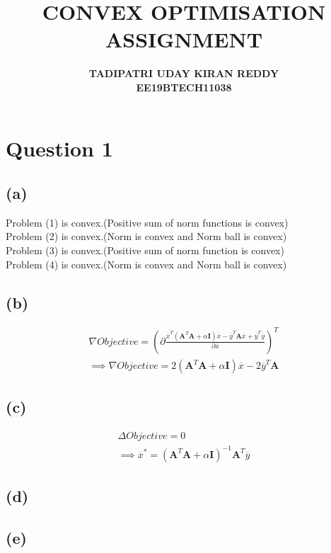\documentclass{article}
\begin{document}
\title{\textbf{CONVEX OPTIMISATION}\\{\textbf{ASSIGNMENT }}}
\author{\textbf{TADIPATRI UDAY KIRAN REDDY}\\\textbf{EE19BTECH11038}}
\maketitle

\section*{\hfil Question 1}
\subsection*{(a)}
Problem (1) is convex.(Positive sum of norm functions is convex)\\
Problem (2) is convex.(Norm is convex and Norm ball is convex)\\
Problem (3) is convex.(Positive sum of norm function is convex)\\
Problem (4) is convex.(Norm is convex and Norm ball is convex)
\subsection*{(b)}
\begin{gather*}
	\nabla Objective = \left(\partial \frac{\overline{x}^T(\mathbf{A}^T\mathbf{A}+\alpha \mathbf{I})\overline{x} - \overline{y}^T\mathbf{A}\overline{x} + \overline{y}^T\overline{y}}{\partial \overline{x}}\right)^T\\
	\implies \nabla Objective = 2(\mathbf{A}^T\mathbf{A}+\alpha \mathbf{I})\overline{x} - 2\overline{y}^T\mathbf{A}
\end{gather*}
\subsection*{(c)}
\begin{gather*}
	\Delta Objective = 0\\
	\implies \overline{x}^* = (\mathbf{A}^T\mathbf{A}+\alpha \mathbf{I})^{-1}\mathbf{A}^T\overline{y}
\end{gather*}
\subsection*{(d)}
\subsection*{(e)}
\end{document}
